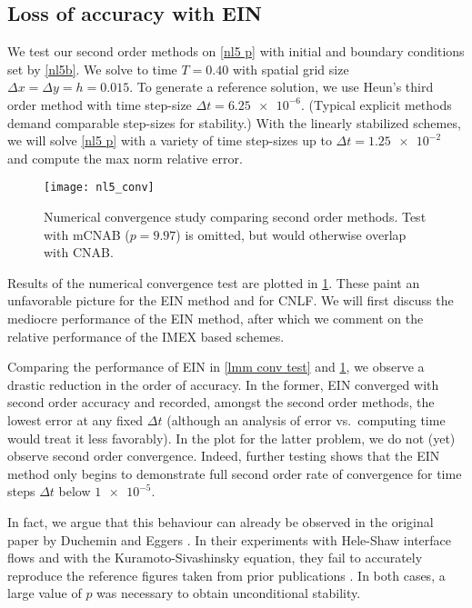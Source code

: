 \subsection{Loss of accuracy with EIN}
We test our second order methods on \cref{nl5 p} with initial and boundary conditions set by \cref{nl5b}. We solve to time $T=0.40$ with spatial grid size $\Delta x = \Delta y = h =0.015$. To generate a reference solution, we use Heun's third order method with time step-size $\Delta t=\num{6.25e-6}$. (Typical explicit methods demand comparable step-sizes for stability.) With the linearly stabilized schemes, we will solve \cref{nl5 p} with a variety of time step-sizes up to $\Delta t = \num{1.25e-2}$ and compute the max norm relative error.

\begin{figure}[htb!]
        \centering
\texttt{[image: nl5\_conv]}
\caption[Numerical convergence study comparing second order methods]{Numerical convergence study comparing second order methods. Test with mCNAB ($p=9.97$) is omitted, but would otherwise overlap with CNAB.}
\label{fig:nl5 conv}
\end{figure}

Results of the numerical convergence test are plotted in \cref{fig:nl5 conv}. These paint an unfavorable picture for the EIN method and for CNLF. We will first discuss the mediocre performance of the EIN method, after which we comment on the relative performance of the IMEX based schemes. 

Comparing the performance of EIN in \cref{lmm conv test} and \cref{fig:nl5 conv}, we observe a drastic reduction in the order of accuracy. In the former, EIN converged with second order accuracy and recorded, amongst the second order methods, the lowest error at any fixed $\Delta t$ (although an analysis of error vs.\ computing time would treat it less favorably). In the plot for the latter problem, we do not (yet) observe second order convergence. Indeed, further testing shows that the EIN method only begins to demonstrate full second order rate of convergence for time steps $\Delta t$ below $\num{1e-5}$.

In fact, we argue that this behaviour can already be observed in the original paper by Duchemin and Eggers \cite{duchemin2014explicit}. In their experiments with Hele-Shaw interface flows and with the Kuramoto-Sivashinsky equation, they fail to accurately reproduce the reference figures taken from prior publications \cite{hou1994removing,kassam2005fourth}. In both cases, a large value of $p$ was necessary to obtain unconditional stability. 


